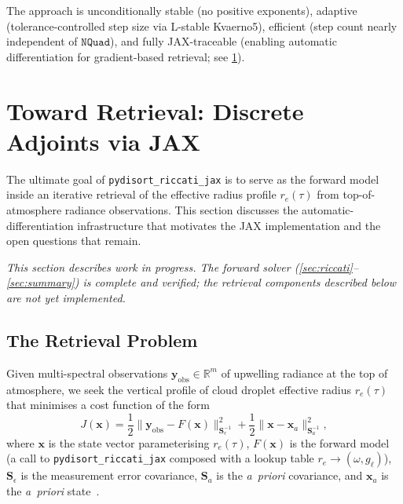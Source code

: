 \documentclass[11pt,a4paper]{article}
\newcommand{\R}{\mathbb{R}}
\newcommand{\vect}[1]{\bm{#1}}
\newcommand{\mat}[1]{\mathbf{#1}}
\theoremstyle{definition}
\begin{document}
The approach is unconditionally stable (no positive exponents),
adaptive (tolerance-controlled step size via L-stable Kvaerno5),
efficient (step count nearly independent of $\texttt{NQuad}$), and
fully JAX-traceable (enabling automatic differentiation for
gradient-based retrieval; see \cref{sec:retrieval}).

\section{Toward Retrieval: Discrete Adjoints via JAX}\label{sec:retrieval}

The ultimate goal of \texttt{pydisort\_riccati\_jax} is to serve as the
forward model inside an iterative retrieval of the effective radius
profile $r_e(\tau)$ from top-of-atmosphere radiance observations.  This
section discusses the automatic-differentiation infrastructure that
motivates the JAX implementation and the open questions that remain.

\emph{This section describes work in progress.  The forward solver
(\cref{sec:riccati}--\cref{sec:summary}) is complete and verified; the
retrieval components described below are not yet implemented.}

\subsection{The Retrieval Problem}\label{sec:retrieval-problem}

Given multi-spectral observations $\vect{y}_{\mathrm{obs}} \in \R^m$ of
upwelling radiance at the top of atmosphere, we seek the vertical
profile of cloud droplet effective radius $r_e(\tau)$ that minimises a
cost function of the form
\begin{equation}\label{eq:cost}
  J(\vect{x})
  = \frac{1}{2}\bigl\|\vect{y}_{\mathrm{obs}} - F(\vect{x})\bigr\|^2_{\mat{S}_\epsilon^{-1}}
  + \frac{1}{2}\bigl\|\vect{x} - \vect{x}_a\bigr\|^2_{\mat{S}_a^{-1}},
\end{equation}
where $\vect{x}$ is the state vector parameterising $r_e(\tau)$,
$F(\vect{x})$ is the forward model (a call to
\texttt{pydisort\_riccati\_jax} composed with a lookup table
$r_e \to (\omega, g_\ell)$), $\mat{S}_\epsilon$ is the measurement
error covariance, $\mat{S}_a$ is the \emph{a~priori} covariance, and
$\vect{x}_a$ is the \emph{a~priori} state~\cite{rodgers2000}.
\end{document}
